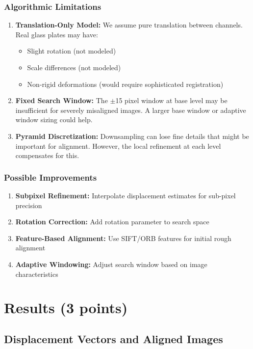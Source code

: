 \documentclass[11pt]{article}
\begin{document}
\subsubsection{Algorithmic Limitations}

\begin{enumerate}
\item \textbf{Translation-Only Model:} We assume pure translation between channels. Real glass plates may have:
\begin{itemize}
\item Slight rotation (not modeled)
\item Scale differences (not modeled)
\item Non-rigid deformations (would require sophisticated registration)
\end{itemize}

\item \textbf{Fixed Search Window:} The $\pm$15 pixel window at base level may be insufficient for severely misaligned images. A larger base window or adaptive window sizing could help.

\item \textbf{Pyramid Discretization:} Downsampling can lose fine details that might be important for alignment. However, the local refinement at each level compensates for this.
\end{enumerate}

\subsubsection{Possible Improvements}

\begin{enumerate}
\item \textbf{Subpixel Refinement:} Interpolate displacement estimates for sub-pixel precision
\item \textbf{Rotation Correction:} Add rotation parameter to search space
\item \textbf{Feature-Based Alignment:} Use SIFT/ORB features for initial rough alignment
\item \textbf{Adaptive Windowing:} Adjust search window based on image characteristics
\end{enumerate}

\section{Results (3 points)}

\subsection{Displacement Vectors and Aligned Images}
\end{document}
